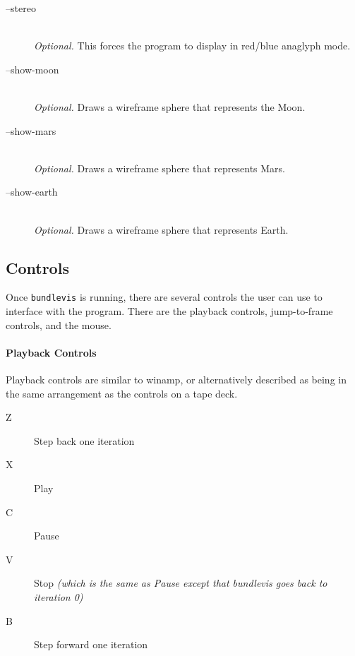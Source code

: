 \begin{description}
\item[--stereo] \hfill \\

  \emph{Optional.} This forces the program to display in red/blue
  anaglyph mode.

\item[--show-moon] \hfill \\

  \emph{Optional.} Draws a wireframe sphere that represents the Moon.

\item[--show-mars] \hfill \\

  \emph{Optional.} Draws a wireframe sphere that represents Mars.

\item[--show-earth] \hfill \\

  \emph{Optional.} Draws a wireframe sphere that represents Earth.

\end{description}

\subsection{Controls}

Once \texttt{bundlevis} is running, there are several controls the user can use to interface with the program. There are the playback controls, jump-to-frame controls, and the mouse.

\paragraph{Playback Controls}
Playback controls are similar to winamp, or alternatively described as
being in the same arrangement as the controls on a tape deck.

\newenvironment{myindentpar}[1]
               {\begin{list}{}
                   {\setlength{\leftmargin}{#1}}
                 \item[]
               }
               {\end{list}}

\begin{myindentpar}{3cm}
\begin{description}
  \item[Z] Step back one iteration
  \item[X] Play
  \item[C] Pause
  \item[V] Stop \emph{(which is the same as Pause except that
    bundlevis goes back to iteration 0)}
  \item[B] Step forward one iteration
\end{description}
\end{myindentpar}

